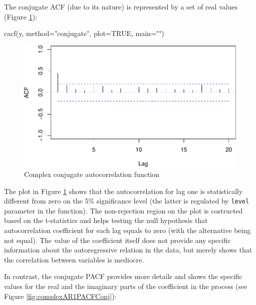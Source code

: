\documentclass[
]{book}
\newenvironment{Shaded}{\begin{snugshade}}{\end{snugshade}}
\newcommand{\AttributeTok}[1]{\textcolor[rgb]{0.77,0.63,0.00}{#1}}
\newcommand{\ConstantTok}[1]{\textcolor[rgb]{0.00,0.00,0.00}{#1}}
\newcommand{\FunctionTok}[1]{\textcolor[rgb]{0.00,0.00,0.00}{#1}}
\newcommand{\NormalTok}[1]{#1}
\newcommand{\StringTok}[1]{\textcolor[rgb]{0.31,0.60,0.02}{#1}}
\begin{document}
The conjugate ACF (due to its nature) is represented by a set of real values (Figure \ref{fig:complexAR1ACFConj}):

\begin{Shaded}
\begin{Highlighting}[]
\FunctionTok{cacf}\NormalTok{(y, }\AttributeTok{method=}\StringTok{"conjugate"}\NormalTok{, }\AttributeTok{plot=}\ConstantTok{TRUE}\NormalTok{, }\AttributeTok{main=}\StringTok{""}\NormalTok{)}
\end{Highlighting}
\end{Shaded}

\begin{figure}
\centering
\includegraphics{Svetunkov---Svetunkov---Complex-Valued-Econometrics_files/figure-latex/complexAR1ACFConj-1.pdf}
\caption{\label{fig:complexAR1ACFConj}Complex conjugate autocorrelation function}
\end{figure}

The plot in Figure \ref{fig:complexAR1ACFConj} shows that the autocorrelation for lag one is statistically different from zero on the 5\% significance level (the latter is regulated by \texttt{level} parameter in the function). The non-rejection region on the plot is costructed based on the t-statistics and helps testing the null hypothesis that autocorrelation coefficient for each lag equals to zero (with the alternative being not equal). The value of the coefficient itself does not provide any specific information about the autoregressive relation in the data, but merely shows that the correlation between variables is mediocre.

In contrast, the conjugate PACF provides more details and shows the specific values for the real and the imaginary parts of the coefficient in the process (see Figure \ref{fig:complexAR1PACFConj}):
\end{document}
